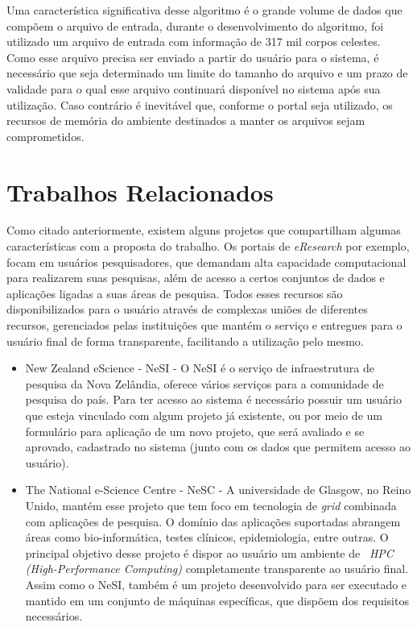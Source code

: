 \documentclass[tg]{mdtufsm}
\begin{document}
Uma característica significativa desse algoritmo é o grande volume de dados que compõem o arquivo de entrada, durante o desenvolvimento do algoritmo, foi utilizado um arquivo de entrada com informação de 317 mil corpos celestes. Como esse arquivo precisa ser enviado a partir do usuário para o sistema, é necessário que seja determinado um limite do tamanho do arquivo e um prazo de validade para o qual esse arquivo continuará disponível no sistema após sua utilização. Caso contrário é inevitável que, conforme o portal seja utilizado, os recursos de memória do ambiente destinados a manter os arquivos sejam comprometidos.

\section{Trabalhos Relacionados}
Como citado anteriormente, existem alguns projetos que compartilham algumas características com a proposta do trabalho.
Os portais de \emph{eResearch} por exemplo, focam em usuários pesquisadores, que demandam alta capacidade computacional para realizarem suas pesquisas, além de acesso a certos conjuntos de dados e aplicações ligadas a suas áreas de pesquisa. Todos esses recursos são disponibilizados para o usuário através de complexas uniões de diferentes recursos, gerenciados pelas instituições que mantém o serviço e entregues para o usuário final de forma transparente, facilitando a utilização pelo mesmo.

\begin{itemize}
	\item New Zealand eScience - NeSI \cite{nesi} - O NeSI é o serviço de infraestrutura de pesquisa da Nova Zelândia, oferece vários serviços para a comunidade de pesquisa do país. Para ter acesso ao sistema é necessário possuir um usuário que esteja vinculado com algum projeto já existente, ou por meio de um formulário para aplicação de um novo projeto, que será avaliado e se aprovado, cadastrado no sistema (junto com os dados que permitem acesso ao usuário).
	\item The National e-Science Centre - NeSC \cite{nesc} - A universidade de Glasgow, no Reino Unido, mantém esse projeto que tem foco em tecnologia de \emph{grid} combinada com aplicações de pesquisa. O domínio das aplicações suportadas abrangem áreas como bio-informática, testes clínicos, epidemiologia, entre outras. O principal objetivo desse projeto é dispor ao usuário um ambiente de ~\emph{HPC (High-Performance Computing)} completamente transparente ao usuário final. Assim como o NeSI, também é um projeto desenvolvido para ser executado e mantido em um conjunto de máquinas específicas, que dispõem dos requisitos necessários.
\end{itemize}
\iffalse
\end{document}
